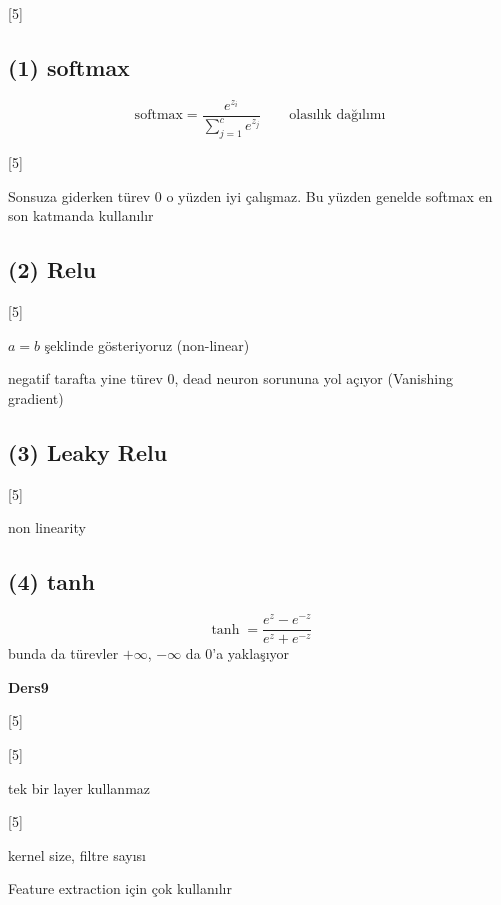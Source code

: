 \documentclass[11pt,a4paper]{article}
\begin{document}
[5]

\subsection{(1) softmax}
\[ \mathrm{softmax}=\frac{e^{z_i}}{\sum_{j=1}^{c} e^{z_j}} \qquad \text{olasılık dağılımı} \]

[5]

Sonsuza giderken türev 0 o yüzden iyi çalışmaz. Bu yüzden genelde softmax en son katmanda kullanılır

\subsection{(2) Relu}

[5]

$a=b$ şeklinde gösteriyoruz (non-linear)

negatif tarafta yine türev 0, dead neuron sorununa yol açıyor (Vanishing gradient)

\subsection{(3) Leaky Relu}

[5]

non linearity

\subsection{(4) tanh}
\[ \tanh=\frac{e^{z}-e^{-z}}{e^{z}+e^{-z}} \]
bunda da türevler $+\infty$, $-\infty$ da 0'a yaklaşıyor


\textbf{Ders9}

[5]

[5]

tek bir layer kullanmaz

[5]

kernel size, filtre sayısı

Feature extraction için çok kullanılır
\end{document}
